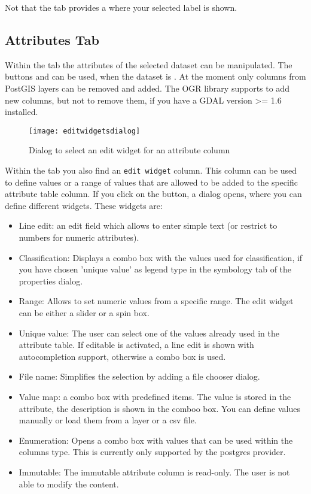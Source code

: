 Not that the  tab provides a  where your
selected label is shown.

\subsection{Attributes Tab}\label{label_attributes}

Within the  tab the attributes of the selected dataset can be
manipulated. The buttons  and
 can be
used, when the dataset is .
At the moment only columns from PostGIS layers can be removed and added. The
OGR library supports to add new columns, but not to remove them, if you have
a GDAL version >= 1.6 installed.


\begin{figure}[ht]
   \centering
   \texttt{[image: editwidgetsdialog]}
   \caption{Dialog to select an edit widget for an attribute column
\nixcaption}\label{fig:editwidget}   
\end{figure}

Within the  tab you also find an \texttt{edit widget} column.
This column can be used to define values or a range of values that are
allowed
to be added to the specific attribute table column. If you click on the
 button, a dialog opens, where you can define different
widgets. These widgets are:

\begin{itemize}[label=--]
\item Line edit: an edit field which allows to enter simple text (or restrict
to
numbers for numeric attributes).
\item Classification: Displays a combo box with the values used for
classification, if you have chosen 'unique value' as legend type in the
symbology tab of the properties dialog.
\item Range: Allows to set numeric values from a specific range. The edit
widget can be either a slider or a spin box.
\item Unique value: The user can select one of the values already used in the
attribute table. If editable is activated, a line edit is shown with
autocompletion support, otherwise a combo box is used.
\item File name: Simplifies the selection by adding a file chooser dialog.
\item Value map: a combo box with predefined items. The value is stored in
the attribute, the description is shown in the comboo box. You can define
values manually or load them from a layer or a csv file.
\item Enumeration: Opens a combo box with values that can be used within the
columns type. This is currently only supported by the postgres provider.
\item Immutable: The immutable attribute column is read-only. The user is not
able to modify the content.
\end{itemize}

